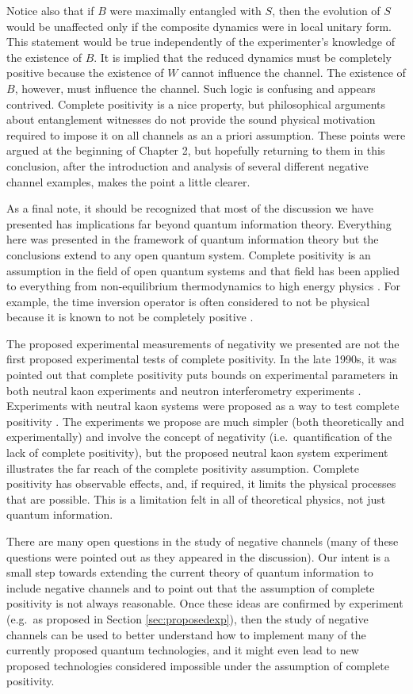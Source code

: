 Notice also that if $B$ were maximally entangled with $S$, then the evolution of $S$ would be unaffected only if the composite dynamics were in local unitary form.  This statement would be true independently of the experimenter's knowledge of the existence of $B$.  It is implied that the reduced dynamics must be completely positive because the existence of $W$ cannot influence the channel.  The existence of $B$, however, must influence the channel.  Such logic is confusing and appears contrived.  Complete positivity is a nice property, but philosophical arguments about entanglement witnesses do not provide the sound physical motivation required to impose it on all channels as an a priori assumption.  These points were argued at the beginning of Chapter 2, but hopefully returning to them in this conclusion, after the introduction and analysis of several different negative channel examples, makes the point a little clearer. 

As a final note, it should be recognized that most of the discussion we have presented has implications far beyond quantum information theory.  Everything here was presented in the framework of quantum information theory but the conclusions extend to any open quantum system.  Complete positivity is an assumption in the field of open quantum systems and that field has been applied to everything from non-equilibrium thermodynamics to high energy physics \cite{Breuer2007}.  For example, the time inversion operator is often considered to not be physical because it is known to not be completely positive \cite{Busch1990}.    

The proposed experimental measurements of negativity we presented are not the first proposed experimental tests of complete positivity.  In the late 1990s, it was pointed out that complete positivity puts bounds on experimental parameters in both neutral kaon experiments \cite{Benatti1996} \cite{Benatti1997} \cite{Benatti1998} and neutron interferometry experiments \cite{Benatti1999}.  Experiments with neutral kaon systems were proposed as a way to test complete positivity \cite{Benatti1997a}.  The experiments we propose are much simpler (both theoretically and experimentally) and involve the concept of negativity (i.e.\ quantification of the lack of complete positivity), but the proposed neutral kaon system experiment illustrates the far reach of the complete positivity assumption.  Complete positivity has observable effects, and, if required, it limits the physical processes that are possible.  This is a limitation felt in all of theoretical physics, not just quantum information.   

There are many open questions in the study of negative channels (many of these questions were pointed out as they appeared in the discussion).  Our intent is a small step towards extending the current theory of quantum information to include negative channels and to point out that the assumption of complete positivity is not always reasonable.  Once these ideas are confirmed by experiment (e.g.\ as proposed in Section \ref{sec:proposedexp}), then the study of negative channels can be used to better understand how to implement many of the currently proposed quantum technologies, and it might even lead to new proposed technologies considered impossible under the assumption of complete positivity.